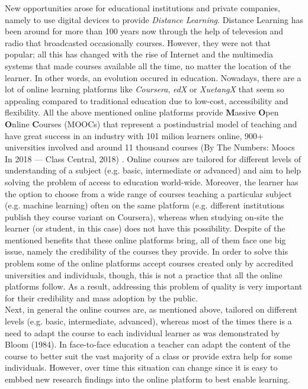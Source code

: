 \documentclass[11]{article}
\begin{document}
		\indent
		New opportunities arose for educational institutions and private companies, namely to use digital devices to provide \textit{Distance Learning}.
		Distance Learning has been around for more than 100 years now through the help of televesion and radio that  broadcasted occasionally courses. However, they were not that popular; all this has changed with the rise of Internet and the multimedia systems that made courses available all the time, no matter the location of the learner. In other words, an evolution occured in education. Nowadays, there are a lot of online learning platforms like \textit{Coursera}, \textit{edX} or \textit{XuetangX} that seem so appealing compared to traditional education due to low-cost, accessibility and flexibility. All the above mentioned online platforms provide \textbf{M}assive \textbf{O}pen \textbf{O}nline \textbf{C}ourses (MOOCs) that represent a postindustrial model of teaching and have great success in an industry with 101 milion learners online, 900+ universities involved and around 11 thousand courses (By The Numbers: Moocs In 2018 — Class Central, 2018) . Online courses are tailored for different levels of understanding of a subject (e.g. basic, intermediate or advanced) and aim to help solving the problem of  access to education world-wide. Moreover, the learner has the option to  choose from a wide range of courses teaching a particular subject (e.g. machine learning) often on the same platform (e.g. different institutions publish they course variant on Coursera), whereas when studying on-site the learner (or student, in this case) does not have this possibility. Despite of the mentioned benefits that these online platforms bring, all of them face one big issue, namely the credibility of the courses they provide. In order to solve this problem some of the online platforms accept courses created only by accredited universities and individuals, though, this is not a practice that all the online platforms follow. As a result, addressing this problem of quality is very important for their credibility and mass adoption by the public.\\
Next, in general the online courses are, as mentioned above, tailored on different levels (e.g. basic, intermediate, advanced), whereas most of the times there is a need to adapt the course to each individual learner as was demonstrated by Bloom (1984). In face-to-face education a teacher can adapt the content of the course to better suit the vast majority of a class or provide extra help for some individuals. However, over time this situation can change since it is easy to embbed new research findings into the online platform to best enable learning.\\
\end{document}
